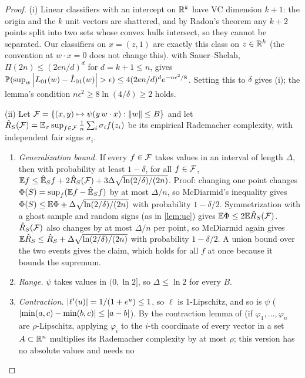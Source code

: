 \begin{proof}
(i) Linear classifiers with an intercept on $\mathbb{R}^k$ have VC dimension $k+1$: the origin and the
$k$ unit vectors are shattered, and by Radon's theorem any $k+2$ points split into two sets whose
convex hulls intersect, so they cannot be separated. Our classifiers on $x=(z,1)$ are exactly
this class on $z\in\mathbb{R}^k$ (the convention at $w\cdot x=0$ does not change this).  with Sauer--Shelah, $\Pi(2n)\le(2en/d)^d$ for $d=k+1\le n$,
gives $\mathbb{P}(\sup_w\left\lvert L_{01}(w)-\hat L_{01}(w) \right\rvert>\epsilon)\le4(2en/d)^de^{-n\epsilon^2/8}$. Setting
this to $\delta$ gives (i); the lemma's condition $n\epsilon^2\ge8\ln(4/\delta)\ge2$ holds.

(ii) Let $\mathcal{F}=\{(x,y)\mapsto\psi(y\,w\cdot x):\left\lVert w \right\rVert\le B\}$ and let
$\hat R_S(\mathcal{F})=\mathbb{E}_\sigma\sup_{f\in\mathcal{F}}\frac1n\sum_i\sigma_if(z_i)$ be its empirical Rademacher
complexity, with independent fair signs $\sigma_i$.
\begin{enumerate}[label=(\alph*),leftmargin=*]
  \item \emph{Generalization bound.} If every $f\in\mathcal{F}$ takes values in an interval of length
  $\Delta$, then with probability at least $1-\delta$, for all $f\in\mathcal{F}$,
  $\mathbb{E} f\le\hat{\mathbb{E}}_Sf+2\hat R_S(\mathcal{F})+3\Delta\sqrt{\ln(2/\delta)/(2n)}$. Proof: changing one point
  changes $\Phi(S)=\sup_f(\mathbb{E} f-\hat{\mathbb{E}}_Sf)$ by at most $\Delta/n$, so McDiarmid's inequality \citep{mcdiarmid1989method} gives
  $\Phi(S)\le\mathbb{E}\Phi+\Delta\sqrt{\ln(2/\delta)/(2n)}$ with probability $1-\delta/2$. Symmetrization
  with a ghost sample and random signs (as in \cref{lem:uc}) gives $\mathbb{E}\Phi\le2\mathbb{E}\hat R_S(\mathcal{F})$.
  $\hat R_S(\mathcal{F})$ also changes by at most $\Delta/n$ per point, so McDiarmid again gives
  $\mathbb{E}\hat R_S\le\hat R_S+\Delta\sqrt{\ln(2/\delta)/(2n)}$ with probability $1-\delta/2$. A union
  bound over the two events gives the claim, which holds for all $f$ at once because it bounds
  the supremum.
  \item \emph{Range.} $\psi$ takes values in $(0,\ln2]$, so $\Delta\le\ln2$ for every $B$.
  \item \emph{Contraction.} $\left\lvert \ell'(u) \right\rvert=1/(1+e^{u})\le1$, so $\ell$ is 1-Lipschitz, and so is
  $\psi$ ($\left\lvert \min(a,c)-\min(b,c) \right\rvert\le\left\lvert a-b \right\rvert$). By the contraction lemma of
  \citet[ch.~26]{shalevshwartz2014understanding} (if $\varphi_1,\dots,\varphi_n$ are $\rho$-Lipschitz,
  applying $\varphi_i$ to the $i$-th coordinate of every vector in a set $A\subset\mathbb{R}^n$ multiplies its
  Rademacher complexity by at most $\rho$; this version has no absolute values and needs no

\end{enumerate}
\end{proof}
